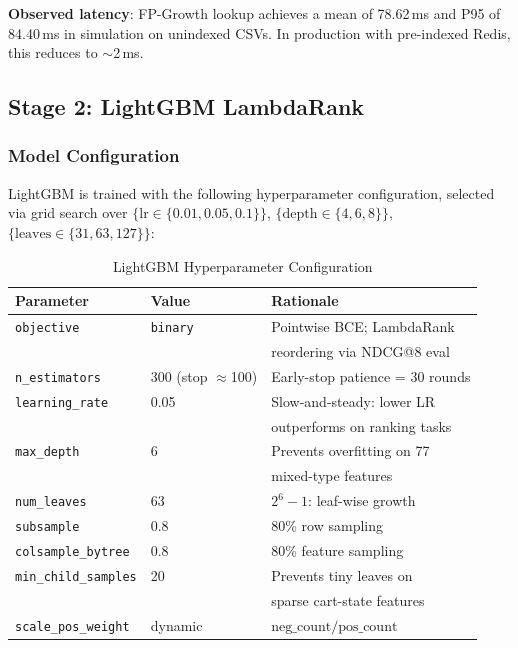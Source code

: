 \documentclass[conference]{IEEEtran}
\begin{document}
\textbf{Observed latency}: FP-Growth lookup achieves a mean of 78.62\,ms and
P95 of 84.40\,ms in simulation on unindexed CSVs. In production with
pre-indexed Redis, this reduces to $\sim$2\,ms.

\subsection{Stage 2: LightGBM LambdaRank}

\subsubsection{Model Configuration}

LightGBM is trained with the following hyperparameter
configuration, selected via grid search over
$\{\text{lr} \in \{0.01, 0.05, 0.1\}\}$,
$\{\text{depth} \in \{4, 6, 8\}\}$,
$\{\text{leaves} \in \{31, 63, 127\}\}$:

\begin{table}[h]
\caption{LightGBM Hyperparameter Configuration}
\centering
\begin{tabular}{lll}
\toprule
Parameter & Value & Rationale \\
\midrule
\texttt{objective}        & \texttt{binary}  & Pointwise BCE; LambdaRank \\
                          &                   & reordering via NDCG@8 eval \\
\texttt{n\_estimators}    & 300 (stop $\approx$100) & Early-stop patience = 30 rounds \\
\texttt{learning\_rate}   & 0.05             & Slow-and-steady: lower LR \\
                          &                   & outperforms on ranking tasks \\
\texttt{max\_depth}       & 6                & Prevents overfitting on 77 \\
                          &                   & mixed-type features \\
\texttt{num\_leaves}      & 63               & $2^6 - 1$: leaf-wise growth \\
\texttt{subsample}        & 0.8              & 80\% row sampling \\
\texttt{colsample\_bytree}& 0.8              & 80\% feature sampling \\
\texttt{min\_child\_samples} & 20            & Prevents tiny leaves on \\
                          &                   & sparse cart-state features \\
\texttt{scale\_pos\_weight} & dynamic        & $\text{neg\_count}/\text{pos\_count}$ \\
\bottomrule
\end{tabular}
\end{table}
\end{document}
